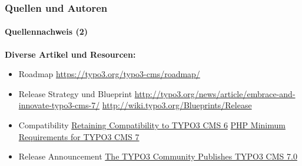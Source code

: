 \begin{frame}[fragile]
	\frametitle{Quellen und Autoren}
	\framesubtitle{Quellennachweis (2)}

	\textbf{Diverse Artikel und Resourcen:}
	\begin{itemize}\smaller

		\item Roadmap\newline
			\url{https://typo3.org/typo3-cms/roadmap/}
		\item Release Strategy und Blueprint\newline
			\url{http://typo3.org/news/article/embrace-and-innovate-typo3-cms-7/}
			\url{http://wiki.typo3.org/Blueprints/Release}
		\item Compatibility\newline
			\href{http://typo3.org/news/article/retaining-compatibility-to-typo3-cms6/}{Retaining Compatibility to TYPO3 CMS 6}\newline
			\href{http://typo3.org/news/article/php-minimum-requirements-for-typo3-cms-7/}{PHP Minimum Requirements for TYPO3 CMS 7}
		\item Release Announcement\newline
			\href{http://typo3.org/news/article/the-typo3-community-publishes-typo3-cms-70-a-new-version-of-its-free-content-management-system/}{The TYPO3 Community Publishes TYPO3 CMS 7.0}

	\end{itemize}

\end{frame}


